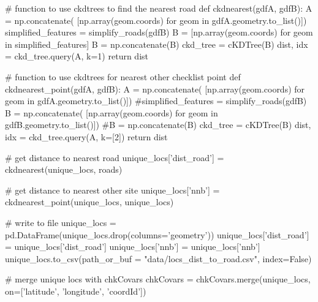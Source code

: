 \documentclass[]{article}
\newenvironment{Shaded}{}{}
\newcommand{\CommentTok}[1]{\textcolor[rgb]{0.00,0.50,0.00}{#1}}
\newcommand{\ControlFlowTok}[1]{\textcolor[rgb]{0.00,0.00,1.00}{#1}}
\newcommand{\DecValTok}[1]{#1}
\newcommand{\KeywordTok}[1]{\textcolor[rgb]{0.00,0.00,1.00}{#1}}
\newcommand{\NormalTok}[1]{#1}
\newcommand{\OperatorTok}[1]{#1}
\newcommand{\StringTok}[1]{\textcolor[rgb]{0.00,0.50,0.50}{#1}}
\newcommand{\VariableTok}[1]{#1}
\begin{document}
\begin{Shaded}
\begin{Highlighting}[]
\CommentTok{# function to use ckdtrees to find the nearest road}
\KeywordTok{def}\NormalTok{ ckdnearest(gdfA, gdfB):}
\NormalTok{    A }\OperatorTok{=}\NormalTok{ np.concatenate(}
\NormalTok{    [np.array(geom.coords) }\ControlFlowTok{for}\NormalTok{ geom }\KeywordTok{in}\NormalTok{ gdfA.geometry.to_list()])}
\NormalTok{    simplified_features }\OperatorTok{=}\NormalTok{ simplify_roads(gdfB)}
\NormalTok{    B }\OperatorTok{=}\NormalTok{ [np.array(geom.coords) }\ControlFlowTok{for}\NormalTok{ geom }\KeywordTok{in}\NormalTok{ simplified_features]}
\NormalTok{    B }\OperatorTok{=}\NormalTok{ np.concatenate(B)}
\NormalTok{    ckd_tree }\OperatorTok{=}\NormalTok{ cKDTree(B)}
\NormalTok{    dist, idx }\OperatorTok{=}\NormalTok{ ckd_tree.query(A, k}\OperatorTok{=}\DecValTok{1}\NormalTok{)}
    \ControlFlowTok{return}\NormalTok{ dist}


\CommentTok{# function to use ckdtrees for nearest other checklist point}
\KeywordTok{def}\NormalTok{ ckdnearest_point(gdfA, gdfB):}
\NormalTok{    A }\OperatorTok{=}\NormalTok{ np.concatenate(}
\NormalTok{    [np.array(geom.coords) }\ControlFlowTok{for}\NormalTok{ geom }\KeywordTok{in}\NormalTok{ gdfA.geometry.to_list()])}
    \CommentTok{#simplified_features = simplify_roads(gdfB)}
\NormalTok{    B }\OperatorTok{=}\NormalTok{ np.concatenate(}
\NormalTok{    [np.array(geom.coords) }\ControlFlowTok{for}\NormalTok{ geom }\KeywordTok{in}\NormalTok{ gdfB.geometry.to_list()])}
    \CommentTok{#B = np.concatenate(B)}
\NormalTok{    ckd_tree }\OperatorTok{=}\NormalTok{ cKDTree(B)}
\NormalTok{    dist, idx }\OperatorTok{=}\NormalTok{ ckd_tree.query(A, k}\OperatorTok{=}\NormalTok{[}\DecValTok{2}\NormalTok{])}
    \ControlFlowTok{return}\NormalTok{ dist}


\CommentTok{# get distance to nearest road}
\NormalTok{unique_locs[}\StringTok{'dist_road'}\NormalTok{] }\OperatorTok{=}\NormalTok{ ckdnearest(unique_locs, roads)}

\CommentTok{# get distance to nearest other site}
\NormalTok{unique_locs[}\StringTok{'nnb'}\NormalTok{] }\OperatorTok{=}\NormalTok{ ckdnearest_point(unique_locs, unique_locs)}

\CommentTok{# write to file}
\NormalTok{unique_locs }\OperatorTok{=}\NormalTok{ pd.DataFrame(unique_locs.drop(columns}\OperatorTok{=}\StringTok{'geometry'}\NormalTok{))}
\NormalTok{unique_locs[}\StringTok{'dist_road'}\NormalTok{] }\OperatorTok{=}\NormalTok{ unique_locs[}\StringTok{'dist_road'}\NormalTok{]}
\NormalTok{unique_locs[}\StringTok{'nnb'}\NormalTok{] }\OperatorTok{=}\NormalTok{ unique_locs[}\StringTok{'nnb'}\NormalTok{]}
\NormalTok{unique_locs.to_csv(path_or_buf }\OperatorTok{=} \StringTok{"data/locs_dist_to_road.csv"}\NormalTok{, index}\OperatorTok{=}\VariableTok{False}\NormalTok{)}

\CommentTok{# merge unique locs with chkCovars}
\NormalTok{chkCovars }\OperatorTok{=}\NormalTok{ chkCovars.merge(unique_locs, on}\OperatorTok{=}\NormalTok{[}\StringTok{'latitude'}\NormalTok{, }
                                             \StringTok{'longitude'}\NormalTok{, }\StringTok{'coordId'}\NormalTok{])}
\end{Highlighting}
\end{Shaded}
\end{document}
